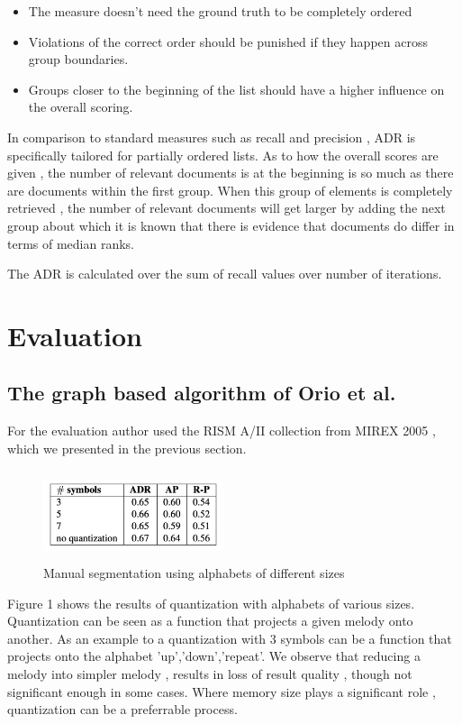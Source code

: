 \documentclass{llncs}
\begin{document}
			\begin{itemize}
				\item The measure doesn't need the ground truth to be completely ordered
				\item Violations of the correct order should be punished if they happen across group boundaries.
				\item Groups closer to the beginning of the list should have a higher influence on the overall scoring.
			\end{itemize}

			In comparison to standard measures such as recall and precision , ADR is specifically tailored for partially ordered lists. As to how the overall scores are given , the number of relevant documents is at the beginning is so much as there are documents within the first group. When this group of elements is completely retrieved , the number of relevant documents will get larger by adding the next group about which it is known that there is evidence that documents do differ in terms of median ranks.

			The ADR is calculated over the sum of recall values over number of iterations.     

	\section{Evaluation}
		\subsection{The graph based algorithm of Orio et al.}
			For the evaluation author used the RISM A/II collection from MIREX 2005  , which we  presented in the previous section.


			\begin{figure}[h!]
			\centering
			\includegraphics[width=200px,height=100px,keepaspectratio]{one_of_two_point_four}
			\caption{Manual segmentation using alphabets of different sizes \cite{two_point_four}}
			\end{figure}


			Figure 1 shows the results of quantization with alphabets of various sizes. Quantization can be seen as a function that projects a given melody onto another. As an example to a quantization with 3 symbols can be a function that projects onto the alphabet {'up','down','repeat'}. We observe that reducing a melody into simpler melody , results in loss of result quality , though not significant enough in some cases. Where memory size plays a significant role , quantization can be a preferrable process.   
\end{document}

